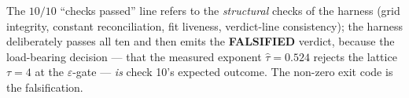 \documentclass[11pt,a4paper]{article}
\newcommand{\red}[1]{\textcolor{red!70!black}{\textbf{#1}}}
\newcommand{\taum}{\ensuremath{\hat{\tau}}}
\begin{document}
\noindent The \(10/10\) ``checks passed'' line refers to the \emph{structural}
checks of the harness (grid integrity, constant reconciliation, fit liveness,
verdict-line consistency); the harness deliberately passes all ten and then
emits the \red{FALSIFIED} verdict, because the load-bearing decision --- that
the measured exponent \(\taum = 0.524\) rejects the lattice \(\tau = 4\) at the
\(\varepsilon\)-gate --- \emph{is} check 10's expected outcome. The non-zero
exit code is the falsification.



\end{document}
